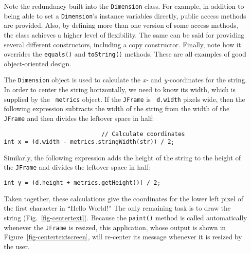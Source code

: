 \noindent Note the redundancy built into the {\tt Dimension} class.  
For example, in addition to being able to set a {\tt Dimension}'s
instance variables directly, public access methods are provided.
Also, by defining more than one version of some access methods, the
class achieves a higher level of flexibility.  The same can be said
for providing several different constructors, including a copy
constructor.  Finally, note how it overrides the {\tt equals()} and
{\tt toString()} methods.  These are all examples of good
object-oriented design.


The {\tt Dimension} object is used to calculate the {\it x-} and {\it
y-}coordinates for the string. In order to center the string
horizontally, we need to know its width, which is supplied by the {\tt
metrics} object.  If the {\tt JFrame} is {\tt
d.width} pixels wide, then the following expression subtracts the
width of the string from the width of the {\tt JFrame} and then divides the
leftover space in half:

\begin{jjjlisting}
\begin{lstlisting}
                            // Calculate coordinates
int x = (d.width - metrics.stringWidth(str)) / 2; 
\end{lstlisting}
\end{jjjlisting}

\noindent Similarly, the following expression adds the height
of the string to the height of the {\tt JFrame} and divides the leftover
space in half:

\begin{jjjlisting}
\begin{lstlisting}
int y = (d.height + metrics.getHeight()) / 2;
\end{lstlisting}
\end{jjjlisting}

\noindent Taken together, these calculations give the coordinates for the
lower left pixel of the first character in ``Hello World!''  The only
remaining task is to draw the string (Fig.~\ref{fig-centertext}).
Because the {\tt paint()} method is called automatically whenever
the {\tt JFrame} is resized, this application, whose output is shown in
Figure~\ref{fig-centertextscreen}, will re-center its message whenever
it is resized by the user.

